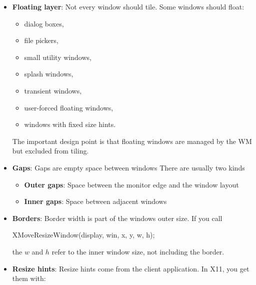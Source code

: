 \documentclass{report}
\begin{document}
\begin{itemize}
\begin{itemize}
                    \item gap size changed,
                    \item client moved to/from floating state.
                \end{itemize}
                Dynamic tiling is simpler than manual tiling.
            \item \textbf{Floating layer}: Not every window should tile.
                \bigbreak \noindent 
                Some windows should float:
                \begin{itemize}
                    \item dialog boxes,
                    \item file pickers,
                    \item small utility windows,
                    \item splash windows,
                    \item transient windows,
                    \item user-forced floating windows,
                    \item windows with fixed size hints.
                \end{itemize}
                \bigbreak \noindent 
                The important design point is that floating windows are managed by the WM but excluded from tiling.
            \item \textbf{Gaps}: Gaps are empty space between windows
                \bigbreak \noindent 
                There are usually two kinds
                \begin{itemize}
                    \item \textbf{Outer gaps}: Space between the monitor edge and the window layout
                    \item \textbf{Inner gaps}:  Space between adjacent windows
                \end{itemize}
            \item \textbf{Borders}: Border width is part of the windows outer size. If you call
                \bigbreak \noindent 
                \begin{cppcode}
                XMoveResizeWindow(display, win, x, y, w, h);
                \end{cppcode}
                \bigbreak \noindent 
                the $w$ and $h$ refer to the inner window size, not including the border.
            \item \textbf{Resize hints}: Resize hints come from the client application. In X11, you get them with:

\end{itemize}
\end{document}
